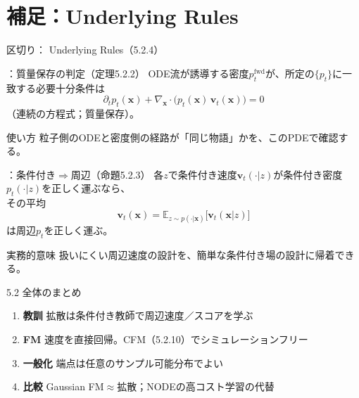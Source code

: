 \section{補足：Underlying Rules}
\assuppl
\begin{frame}{区切り：\supplmark\; Underlying Rules（5.2.4）}
    \tableofcontents[currentsection]
\end{frame}
\assuppl
\begin{frame}{\supplmark：質量保存の判定（定理5.2.2）}
    ODE流が誘導する密度$p_t^{\mathrm{fwd}}$が、所定の$\{p_t\}$に一致する必要十分条件は
    \[
        \partial_t p_t(\bm{x})
        +
        \nabla_{\bm{x}}\cdot\bigl(p_t(\bm{x})\,\bm{v}_t(\bm{x})\bigr)
        =
        0
    \]
    （連続の方程式；質量保存）。
    \begin{exampleblock}{使い方}
        粒子側のODEと密度側の経路が「同じ物語」かを、このPDEで確認する。
    \end{exampleblock}
\end{frame}
\assuppl
\begin{frame}{\supplmark：条件付き$\Rightarrow$周辺（命題5.2.3）}
    各$z$で条件付き速度$\bm{v}_t(\cdot|z)$が条件付き密度$p_t(\cdot|z)$を正しく運ぶなら、\\
    その平均
    \[
        \bm{v}_t(\bm{x})
        =
        \mathbb{E}_{z\sim p(\cdot|\bm{x})}
        \bigl[\bm{v}_t(\bm{x}|z)\bigr]
    \]
    は周辺$p_t$を正しく運ぶ。
    \begin{exampleblock}{実務的意味}
        扱いにくい周辺速度の設計を、簡単な条件付き場の設計に帰着できる。
    \end{exampleblock}
\end{frame}
\asmain
\begin{frame}{5.2 全体のまとめ}
    \begin{enumerate}
        \item \textbf{教訓}
        拡散は条件付き教師で周辺速度／スコアを学ぶ
        \item \textbf{FM}
        速度を直接回帰。CFM（5.2.10）でシミュレーションフリー
        \item \textbf{一般化}
        端点は任意のサンプル可能分布でよい
        \item \textbf{比較}
        Gaussian FM$\approx$拡散；NODEの高コスト学習の代替
    \end{enumerate}
\end{frame}
